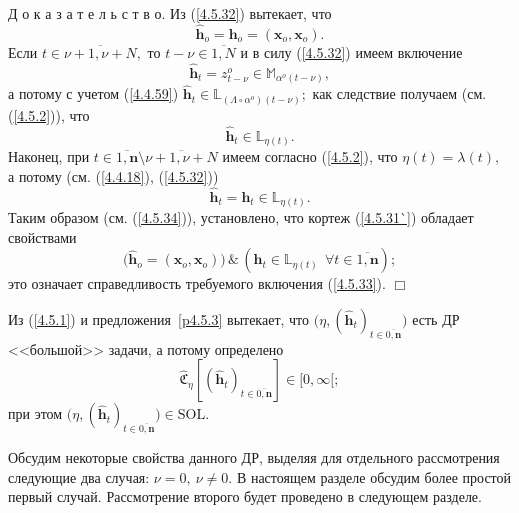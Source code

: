 \documentclass[11pt,twoside,openany]{report}
\newcommand{\bfn}{\begin{equation}}
\newcommand{\efn}{\end{equation}}
\newcommand{\ov}{\overline}
\newcommand{\La}{\Lambda}
\newcommand{\la}{\lambda}
\newcommand{\al}{\alpha}
\newcommand{\fa}{\forall}
\begin{document}
{{Д о к а з а т е л ь с т в о.  Из (\ref{4.5.32}) вытекает, что
\bfn\label{4.5.34}\hat{\mathbf{h}}_o = \mathbf{h}_o = (\mathbf{x}_o,\mathbf{x}_o).
\efn
Если $t\in \ov{\nu+1,\nu+N},$ то $t-\nu \in \ov{1,N}$ и в силу (\ref{4.5.32}) имеем включение
$$\hat{\mathbf{h}}_t = z_{t-\nu}^o \in \mathbb{M}_{\al^o(t-\nu)},
$$
а потому с учетом (\ref{4.4.59}) $\hat{\mathbf{h}}_t \in  \mathbb{L}_{(\La\circ \al^o)(t-\nu)};$
как следствие получаем (см. (\ref{4.5.2})), что
$$\hat{\mathbf{h}}_t \in  \mathbb{L}_{\eta(t)}.
$$
Наконец, при $t\in \ov{1,\mathbf{n}}\setminus \ov{\nu+1,\nu+N}$ имеем согласно (\ref{4.5.2}),
что $\eta(t) = \la(t),$ а потому (см. (\ref{4.4.18}), (\ref{4.5.32}))
$$\hat{\mathbf{h}}_t = \mathbf{h}_t\in \mathbb{L}_{\eta(t)}.
$$
Таким образом (см. (\ref{4.5.34})), установлено, что кортеж (\ref{4.5.31`}) обладает свойствами
$$\bigl(\hat{\mathbf{h}}_o = (\mathbf{x}_o,\mathbf{x}_o)\bigl)\,\&\,(\hat{\mathbf{h}}_t  \in
\mathbb{L}_{\eta(t)}\ \ \fa t\in \ov{1,\mathbf{n}});
$$
это означает справедливость требуемого включения (\ref{4.5.33}). \hfill $\Box$

Из (\ref{4.5.1}) и предложения~\ref{p4.5.3} вытекает, что
$\bigl(\eta,(\hat{\mathbf{h}}_t)_{t\in\ov{0,\mathbf{n}}}\bigl)$ есть ДР <<большой>> задачи,
а потому определено
$$\widehat{\mathfrak{C}}_\eta[(\hat{\mathbf{h}}_t)_{t\in\ov{0,\mathbf{n}}}]\in [0,\infty[;
$$
при этом $\bigl(\eta,(\hat{\mathbf{h}}_t)_{t\in\ov{0,\mathbf{n}}}\bigl)\in \mathrm{SOL}.$

Обсудим некоторые свойства данного ДР, выделяя для отдельного рассмотрения следующие два случая:
$\nu = 0,\ \nu \neq 0.$ В настоящем разделе обсудим более простой первый случай. Рассмотрение
второго будет проведено в следующем разделе.

}}
\end{document}
